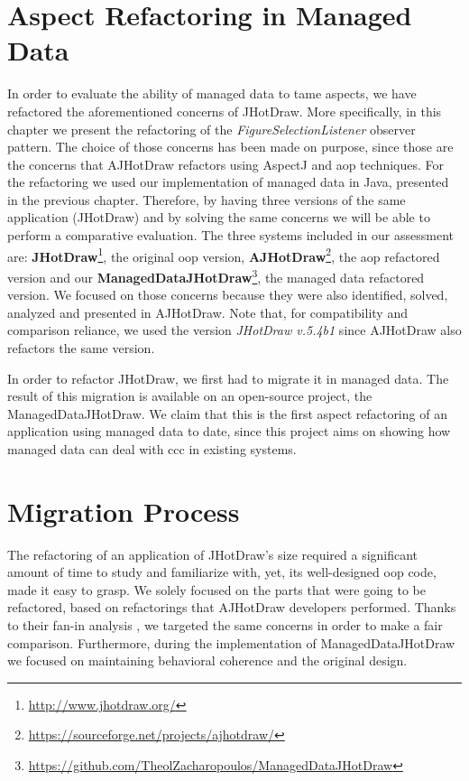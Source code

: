 \section{Aspect Refactoring in Managed Data}
In order to evaluate the ability of managed data to tame aspects, we have refactored the aforementioned concerns of JHotDraw.
More specifically, in this chapter we present the refactoring of the \textit{FigureSelectionListener} observer pattern.
The choice of those concerns has been made on purpose, since those are the concerns that AJHotDraw refactors using AspectJ and \ac{aop} techniques.
For the refactoring we used our implementation of managed data in Java, presented in the previous chapter.
Therefore, by having three versions of the same application (JHotDraw) and by solving the same concerns we will be able to perform a comparative evaluation.
The three systems included in our assessment are: \textbf{JHotDraw}\footnote{\url{http://www.jhotdraw.org/}}, the original \ac{oop} version, \textbf{AJHotDraw}\footnote{\url{https://sourceforge.net/projects/ajhotdraw/}}, the \ac{aop} refactored version and our \textbf{ManagedDataJHotDraw}\footnote{\url{https://github.com/TheolZacharopoulos/ManagedDataJHotDraw}}, the managed data refactored version.
We focused on those concerns because they were also identified, solved, analyzed and presented in AJHotDraw.
Note that, for compatibility and comparison reliance, we used the version \textit{JHotDraw v.5.4b1} since AJHotDraw also refactors the same version.

In order to refactor JHotDraw, we first had to migrate it in managed data.
The result of this migration is available on an open-source project, the ManagedDataJHotDraw.
We claim that this is the first aspect refactoring of an application using managed data to date, since this project aims on showing how managed data can deal with \ac{ccc} in existing systems.

\section{Migration Process}\label{Migration}
The refactoring of an application of JHotDraw's size required a significant amount of time to study and familiarize with, yet, its well-designed \ac{oop} code, made it easy to grasp.
We solely focused on the parts that were going to be refactored, based on refactorings that AJHotDraw developers \cite{marinajhotdraw} performed.
Thanks to their fan-in analysis \cite{marin2004identifying}, we targeted the same concerns in order to make a fair comparison.
Furthermore, during the implementation of ManagedDataJHotDraw we focused on maintaining behavioral coherence and the original design.

